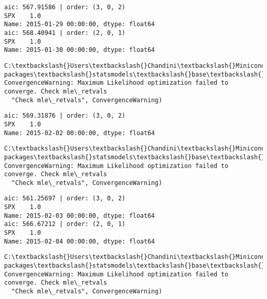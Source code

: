 \documentclass[11pt]{article}
\begin{document}
    \begin{Verbatim}[commandchars=\\\{\}]
aic: 567.91586 | order: (3, 0, 2)
SPX    1.0
Name: 2015-01-29 00:00:00, dtype: float64
aic: 568.40941 | order: (2, 0, 1)
SPX    1.0
Name: 2015-01-30 00:00:00, dtype: float64

    \end{Verbatim}

    \begin{Verbatim}[commandchars=\\\{\}]
C:\textbackslash{}Users\textbackslash{}Chandini\textbackslash{}Miniconda3\textbackslash{}envs\textbackslash{}auquan\textbackslash{}lib\textbackslash{}site-packages\textbackslash{}statsmodels\textbackslash{}base\textbackslash{}model.py:496: ConvergenceWarning: Maximum Likelihood optimization failed to converge. Check mle\_retvals
  "Check mle\_retvals", ConvergenceWarning)

    \end{Verbatim}

    \begin{Verbatim}[commandchars=\\\{\}]
aic: 569.31876 | order: (3, 0, 2)
SPX    1.0
Name: 2015-02-02 00:00:00, dtype: float64

    \end{Verbatim}

    \begin{Verbatim}[commandchars=\\\{\}]
C:\textbackslash{}Users\textbackslash{}Chandini\textbackslash{}Miniconda3\textbackslash{}envs\textbackslash{}auquan\textbackslash{}lib\textbackslash{}site-packages\textbackslash{}statsmodels\textbackslash{}base\textbackslash{}model.py:496: ConvergenceWarning: Maximum Likelihood optimization failed to converge. Check mle\_retvals
  "Check mle\_retvals", ConvergenceWarning)

    \end{Verbatim}

    \begin{Verbatim}[commandchars=\\\{\}]
aic: 561.25697 | order: (3, 0, 2)
SPX    1.0
Name: 2015-02-03 00:00:00, dtype: float64
aic: 566.67212 | order: (2, 0, 1)
SPX    1.0
Name: 2015-02-04 00:00:00, dtype: float64

    \end{Verbatim}

    \begin{Verbatim}[commandchars=\\\{\}]
C:\textbackslash{}Users\textbackslash{}Chandini\textbackslash{}Miniconda3\textbackslash{}envs\textbackslash{}auquan\textbackslash{}lib\textbackslash{}site-packages\textbackslash{}statsmodels\textbackslash{}base\textbackslash{}model.py:496: ConvergenceWarning: Maximum Likelihood optimization failed to converge. Check mle\_retvals
  "Check mle\_retvals", ConvergenceWarning)

    \end{Verbatim}
\end{document}
